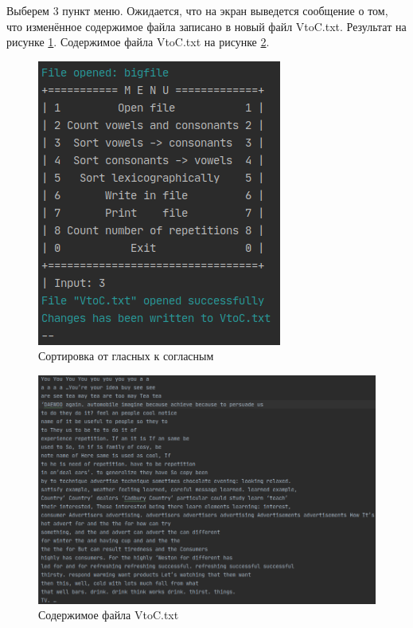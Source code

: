 \documentclass[12pt,a4paper]{article}  %
\begin{document}
Выберем 3 пункт меню. Ожидается, что на экран выведется сообщение о том, что изменённое содержимое файла записано в новый файл VtoC.txt. Результат на рисунке \ref{vtoc}. Содержимое файла VtoC.txt на рисунке \ref{vtoc_txt}.
\begin{figure}[htp!]
	\centering
	\includegraphics[width=0.5\linewidth]{photo/tests/vtoc}
	\caption{Сортировка от гласных к согласным}
	\label{vtoc}
\end{figure}

\begin{figure}[htp!]
	\centering
	\includegraphics[width=0.9\linewidth]{photo/tests/vtoc_txt}
	\caption{Содержимое файла VtoC.txt}
	\label{vtoc_txt}
\end{figure}
\end{document}

